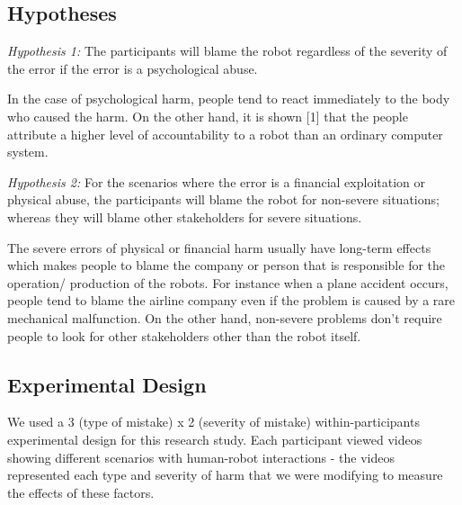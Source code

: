 \documentclass{sigchi}
\begin{document}
\subsection{Hypotheses}
\textit{Hypothesis 1:} The participants will blame the robot regardless of the severity of the error if the error is a psychological abuse.

In the case of psychological harm, people tend to react immediately to the body who caused the harm. On the other hand, it is shown [1] that the people attribute a higher level of accountability to a robot than an ordinary computer system.

\textit{Hypothesis 2:} For the scenarios where the error is a financial exploitation or physical abuse, the participants will blame the robot for non-severe situations; whereas they will blame other stakeholders for severe situations.

The severe errors of physical or financial harm usually have long-term effects which makes people to blame the company or person that is responsible for the operation/ production of the robots. For instance when a plane accident occurs, people tend to blame the airline company even if the problem is caused by a rare mechanical malfunction. On the other hand, non-severe problems don’t require people to look for other stakeholders other than the robot itself.

\subsection{Experimental Design}
We used a 3 (type of mistake) x 2 (severity of mistake)  within-participants experimental design for this research study. Each participant viewed videos showing different scenarios with human-robot interactions - the videos represented each type and severity of harm that we were modifying to measure the effects of these factors.
\end{document}
